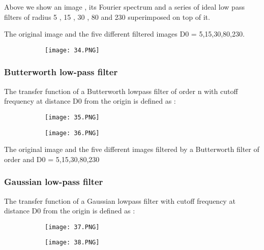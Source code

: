 \documentclass{article}
\begin{document}
Above we show an image , its Fourier spectrum and a series of ideal low pass filters of radius 5 , 15 , 30 , 80 and 230 superimposed on top of it.


The original image and the five different filtered images D0 = 5,15,30,80,230.


 \begin{figure}[ht!]
  \centering
  \begin{subfigure}[b]{0.2\linewidth}
    \texttt{[image: 34.PNG]}
  \end{subfigure}
\end{figure}

\vspace{50cm}

\subsubsection{Butterworth low-pass filter}

The transfer function of a Butterworth lowpass filter of order n with cutoff frequency at distance D0 from the origin is defined as : 

 \begin{figure}[ht!]
  \centering
  \begin{subfigure}[b]{0.7\linewidth}
    \texttt{[image: 35.PNG]}
  \end{subfigure}
     \begin{subfigure}[b]{0.15\textwidth}
         \centering
         \texttt{[image: 36.PNG]}
     \end{subfigure}
\end{figure}

The original image and the five different images filtered by a Butterworth filter of order and D0 = 5,15,30,80,230


\subsubsection{Gaussian low-pass filter}

The transfer function of a Gaussian lowpass filter with cutoff frequency at distance D0 from the origin is defined as : 


\begin{figure}[ht!]
  \centering
  \begin{subfigure}[b]{0.7\linewidth}
    \texttt{[image: 37.PNG]}
  \end{subfigure}
     \begin{subfigure}[b]{0.15\textwidth}
         \centering
         \texttt{[image: 38.PNG]}
     \end{subfigure}
\end{figure}
\end{document}
